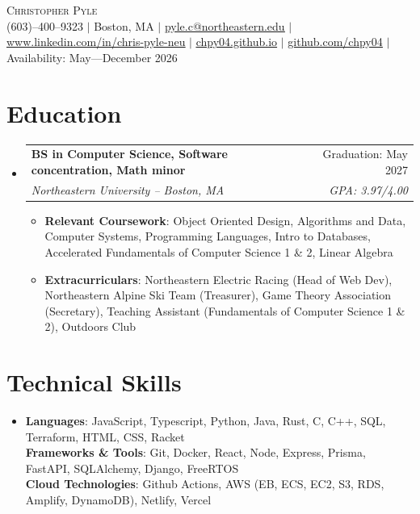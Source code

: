 \documentclass[10pt]{extarticle}
\makeatletter
\newcommand{\resumeItem}[1]{
\item{
#1 \vspace{-1pt}
}
}
\newcommand{\resumeSubheading}[4]{
\vspace{-1pt}\item
\begin{tabular*}{0.97\textwidth}{l@{\extracolsep{\fill}}r}
\textbf{#1} & #2 \\
\textit{#3} & \textit{#4} \\
\end{tabular*}\vspace{-1pt}
}
\newcommand{\resumeSubHeadingListStart}{\begin{itemize}[leftmargin=0.15in,label={}]}
\newcommand{\resumeSubHeadingListEnd}{\end{itemize}}
\newcommand{\resumeItemListStart}{\begin{itemize}\vspace{-3pt}}
\newcommand{\resumeItemListEnd}{\end{itemize}\vspace{-1pt}}
\makeatother
\begin{document}

\begin{center}
 {\Huge \scshape Christopher Pyle} \\ \vspace{1pt}
  (603)--400--9323 
 $|$ Boston, MA $|$
 \href{pyle.c@northeastern.edu}{\underline{pyle.c@northeastern.edu}} $|$
 \href{https://www.linkedin.com/in/chris-pyle-neu/}{\underline{www.linkedin.com/in/chris-pyle-neu}} $|$ \newline
 \href{https://chpy04.github.io/}{\underline{chpy04.github.io}} $|$ \href{https://github.com/chpy04}{\underline{github.com/chpy04}} $|$
 Availability: May---December 2026
\end{center}

\section{Education}
 \resumeSubHeadingListStart{}
 \resumeSubheading{BS in Computer Science, Software concentration, Math minor}
  {Graduation: May 2027}
  {Northeastern University -- Boston, MA}
  {GPA\@: 3.97/4.00}
  \resumeItemListStart{}
    \resumeItem{\textbf{Relevant Coursework}: Object Oriented Design, Algorithms and Data, Computer Systems, Programming Languages, Intro to Databases, Accelerated Fundamentals of Computer Science 1 \& 2, Linear Algebra}
    \resumeItem{\textbf{Extracurriculars}: Northeastern Electric Racing (Head of Web Dev), Northeastern Alpine Ski Team (Treasurer), Game Theory Association (Secretary), Teaching Assistant (Fundamentals of Computer Science 1 \& 2), Outdoors Club}
  \resumeItemListEnd{}
\resumeSubHeadingListEnd{}    

\section{Technical Skills}
\begin{itemize}[leftmargin=0.15in, label={}]
 \item{
 \textbf{Languages}{:  JavaScript, Typescript, Python, Java, Rust, C, C++, SQL, Terraform, HTML, CSS, Racket } \\
 \textbf{Frameworks \& Tools}{: Git, Docker, React, Node, Express, Prisma, FastAPI, SQLAlchemy, Django, FreeRTOS} \\
 \textbf{Cloud Technologies}{: Github Actions, AWS (EB, ECS, EC2, S3, RDS, Amplify, DynamoDB), Netlify, Vercel }
 }
\end{itemize}
\end{document}
